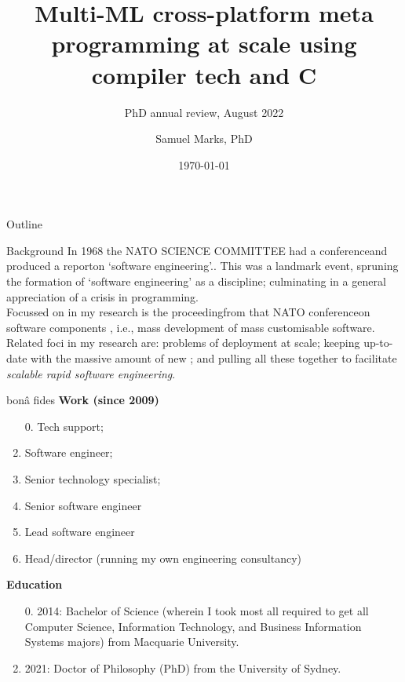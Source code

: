 \documentclass[aspectratio=169,xcolor={dvipsnames}]{beamer}
\author{Samuel Marks, PhD}
\title{Multi\small{-}\LARGE{}ML cross\small{-}\LARGE{}platform meta programming at scale using compiler tech and C}
\subtitle{PhD annual review, August 2022}
\institute{Computer Science and Eng}
\date{\today}
\begin{document}
	\begin{frame}[plain]
		\titlepage
	\end{frame}

	\begin{frame}{Outline}
		\tableofcontents
	\end{frame}

	\begin{frame}{Background}
		In 1968 the NATO SCIENCE COMMITTEE had a conference\textemdash{}and produced a report\textemdash{}on `software engineering'.\cite{naurSoftwareEngineering1968}. This was a landmark event, spruning the formation of `software engineering' as a discipline; culminating in a general appreciation of a crisis in programming.\cite{macroCraftSoftwareEngineering1987}\\[2.5mm]

		Focussed on in my research is the proceeding\textemdash{}from that NATO conference\textemdash{}on software components \cite{mcilroyMassProducedSoftwareComponents1968}, i.e., mass development of mass customisable software.\\[2.5mm]

		Related foci in my research are: problems of deployment at scale; keeping up-to-date with the massive amount of new ; and pulling all these together to facilitate \textit{scalable rapid software engineering}.
	\end{frame}


	\begin{frame}{bonâ fides}
		\textbf{Work (since 2009)}
		\begin{enumerate}
			\item[0.] Tech support;
			\item Software engineer;
			\item Senior technology specialist;
			\item Senior software engineer
			\item Lead software engineer
			\item Head/director (running my own engineering consultancy)
		\end{enumerate}		

		\textbf{Education}
		\begin{enumerate}
			\item[0.] 2014: Bachelor of Science (wherein I took most all required to get all Computer Science, Information Technology, and Business Information Systems majors) from Macquarie University.
			\item 2021: Doctor of Philosophy (PhD) from the University of Sydney.
		\end{enumerate}
	\end{frame}
\end{document}
